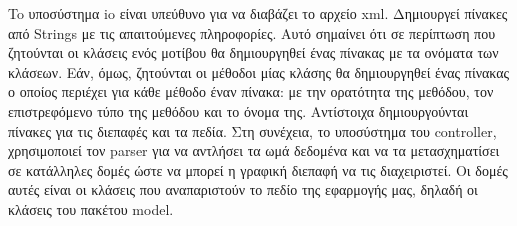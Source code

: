 \par
To υποσύστημα io είναι υπεύθυνο για να διαβάζει το αρχείο xml. 
Δημιουργεί πίνακες από Strings με τις απαιτούμενες πληροφορίες. Αυτό σημαίνει ότι σε περίπτωση που ζητούνται οι κλάσεις ενός μοτίβου 
θα δημιουργηθεί ένας πίνακας με τα ονόματα των κλάσεων. Εάν, όμως, ζητούνται οι μέθοδοι μίας κλάσης θα δημιουργηθεί ένας πίνακας 
ο οποίος περιέχει για κάθε μέθοδο έναν πίνακα: με την ορατότητα της μεθόδου, τον επιστρεφόμενο τύπο της μεθόδου και το όνομα της. 
Αντίστοιχα δημιουργούνται πίνακες για τις διεπαφές και τα πεδία. Στη συνέχεια, το υποσύστημα του controller, 
χρησιμοποιεί τον parser για να αντλήσει τα ωμά δεδομένα και να τα μετασχηματίσει σε κατάλληλες δομές ώστε να μπορεί 
η γραφική διεπαφή να τις διαχειριστεί. Οι δομές αυτές είναι οι κλάσεις που αναπαριστούν το πεδίο της εφαρμογής μας, 
δηλαδή οι κλάσεις του πακέτου model. 
